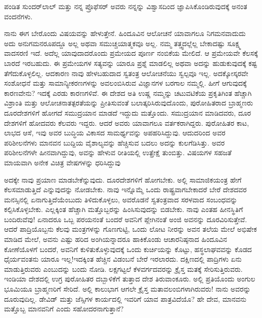 ಪಂಡಿತ ಸುಂದರ್‌ಲಾಲ್ ಮತ್ತು ನನ್ನ ಪ್ರೊಫೆಸರ್ ಅವರು ನನ್ನನ್ನು ವಿಶ್ವಾಸದಿಂದ ಜ್ಞಾಪಿಸಿಕೊಂಡಿರುವುದಕ್ಕೆ ಅನಂತ ವಂದನೆಗಳು.

ನಾನು ಈಗ ಬೇರೊಂದು ವಿಷಯವನ್ನು ಹೇಳುತ್ತೇನೆ. ಹಿಂದೂವಿನ ಆಲೋಚನೆ ಯಾವಾಗಲೂ ನಿಗಮನವಾದುದು  ಅದು ಅನುಗಮನರೂಪದ್ದೂ  ಅಲ್ಲ ಅಥವಾ ಸಮುಚ್ಚಯಾತ್ಮಕವೂ  ಅಲ್ಲ. ನಮ್ಮ ತತ್ತ್ವದಲ್ಲೆಲ್ಲ ಬೇಕಾದಷ್ಟು ಸೂಕ್ಷ್ಮ ವಾದಸರಣಿ ಇದೆ. ಅದೆಲ್ಲ ಯಾವುದಾದರೊಂದು ಪ್ರಮೇಯದ  ಪೂರ್ಣ ನಂಬಿಕೆಯ ಮೇಲಿದೆ. ಆ ಪ್ರಮೇಯವೇ ಕೆಲಸಕ್ಕೆ ಬಾರದೆ ಇರಬಹುದು. ಈ ಪ್ರಮೇಯಗಳ ಸತ್ಯವನ್ನು ಯಾರೂ ಪ್ರಶ್ನೆ ಮಾಡಲಿಲ್ಲ ಅಥವಾ ಅದನ್ನು ಹುಡುಕುವುದಕ್ಕೆ ಕಷ್ಟ ತೆಗೆದುಕೊಳ್ಳಲಿಲ್ಲ. ಆದಕಾರಣ ನಾವು ಹೇಳಬಹುದಾದ ಸ್ವತಂತ್ರ ಆಲೋಚನೆಯು ಸ್ವಲ್ಪವೂ ಇಲ್ಲ. ಅದಕ್ಕೋಸ್ಕರವೇ ಸಂಶೋಧನೆ ಮತ್ತು ಸಾಮಾನ್ಯೀಕರಣಗಳನ್ನು ಅವಲಂಬಿಸಿರುವ ವಿಜ್ಞಾನಗಳ ಬರಗಾಲ ನಮ್ಮಲ್ಲಿ. ಹೀಗೆ ಆಗುವುದಕ್ಕೆ ಕಾರಣವೇನು? ಇದಕ್ಕೆ ಎರಡು ಕಾರಣಗಳಿವೆ. ಈ ದೇಶದ ಅತಿ ಉಷ್ಣ ನಮ್ಮನ್ನು ಚಟುವಟಿಕೆಯ ಪ್ರಕೃತಿಗಿಂತ ಹೆಚ್ಚಾಗಿ ವಿಶ್ರಾಂತಿ ಮತ್ತು ಆಲೋಚನಾತತ್ಪರತೆಯನ್ನು ಪ್ರೀತಿಸುವಂತೆ ಬಲಾತ್ಕರಿಸಿರುವುದೊಂದು, ಪುರೋಹಿತರಾದ ಬ್ರಾಹ್ಮಣರು ದೂರದೇಶಗಳಿಗೆ ಹೋಗದೆ ಸಮುದ್ರಯಾನ ಮಾಡದೆ ಇದ್ದುದು ಮತ್ತೊಂದು. ಸಮುದ್ರಯಾನ ಮಾಡಿದವರು, ದೂರ ದೇಶಗಳಿಗೆ ಹೋದವರು ಕೆಲವರು ಇದ್ದರು. ಆದರೆ ಅವರು ಯಾವಾಗಲೂ ವರ್ತಕರಾಗಿದ್ದರು. ಪುರೋಹಿತರ ಕಾಟ, ಲಾಭದ ಆಸೆ, ಇವು ಅವರ ಬುದ್ಧಿಯ ವಿಕಾಸದ ಸಾಮರ್ಥ್ಯವನ್ನು ಅಪಹರಿಸಿದ್ದುವು. ಆದುದರಿಂದ ಅವರ ಪರಿಶೀಲನೆಗಳು ಮಾನವನ ಬುದ್ದಿಯ ವೈಶಾಲ್ಯವನ್ನು ಹೆಚ್ಚಿಸುವ ಬದಲು ಅದನ್ನು ಕುಲಗೆಡಿಸಿತ್ತು. ಅವರ ಪರಿಶೀಲನೆಗಳೇ ಹೀನವಾಗಿದ್ದುವು, ಅವನ್ನು ಹೇಳುವ ರೀತಿಯಲ್ಲಿ ಉತ್ಪ್ರೇಕ್ಷೆ ತುಂಬಿತ್ತು. ವಿಷಯಗಳ ಸಹಜತೆ ಮಾಯವಾಗಿ ಅನೇಕ ವಿಚಿತ್ರ ವೇಷಗಳನ್ನು ಧರಿಸಿದ್ದುವು

ಅದಕ್ಕೇ ನಾವು ಪ್ರಯಾಣ ಮಾಡಬೇಕೆನ್ನುವುದು. ದೂರದೇಶಗಳಿಗೆ ಹೋಗಬೇಕು. ಅಲ್ಲಿ ಸಾಮಾಜಿಕಯಂತ್ರ ಹೇಗೆ ಕೆಲಸಮಾಡುತ್ತಿದೆ ಎನ್ನುವುದನ್ನು ನೋಡಬೇಕು. ನಾವು ಇನ್ನೊಮ್ಮೆ ಒಂದು ರಾಷ್ಟ್ರವಾಗಬೇಕಾದರೆ ಬೇರೆ ದೇಶದವರ ಮನಸ್ಸಿನಲ್ಲಿ ಏನಾಗುತ್ತಿದೆಯೆಂಬುದು ತಿಳಿದುಕೊಳ್ಳಲು, ಅವರೊಡನೆ ಸ್ವತಂತ್ರವಾದ ಸರಳವಾದ ಸಂಬಂಧವನ್ನು ಕಲ್ಪಿಸಿಕೊಳ್ಳಬೇಕು. ಎಲ್ಲಕ್ಕಿಂತ ಹೆಚ್ಚಾಗಿ ಮತ್ತೊಬ್ಬರನ್ನು ಹಿಂಸಿಸುವುದನ್ನು ಬಿಡಬೇಕು. ನಾವು ಎಂತಹ ಹೀನಸ್ಥಿತಿಗೆ ಬಂದಿರುವೆವು! ಏನಾದರೂ ಒಬ್ಬ ಪರಯನಂತೆ ಬಂದರೆ ಅವನಿಗೆ ಪ್ಲೇಗಿನಂತೆ ಅಂಜಿ ಅವನನ್ನು ದೂರವಿರಿಸುತ್ತೇವೆ. ಆದರೆ ಪಾದ್ರಿಯೊಬ್ಬನು ಕೆಲವು ಮಂತ್ರಗಳನ್ನು ಗೊಣಗುಟ್ಟಿ, ಒಂದು ಲೋಟ ನೀರನ್ನು ಅವನ ತಲೆಯ ಮೇಲೆ ಅಭಿಷೇಕ ಮಾಡಿದ ಮೇಲೆ, ಅವನು ಎಷ್ಟು ಹರಿದ ಅಂಗಿಯನ್ನಾದರೂ ಹಾಕಿಕೊಂಡು ಆಚಾರನಿಷ್ಠನಾದ ಹಿಂದೂವಿನ ಕೋಣೆಯೊಳಗೆ ಬಂದರೆ, ಅವನಿಗೆ ಕುಳಿತುಕೊಳ್ಳುವುದಕ್ಕೆ ಒಂದು ಕುರ್ಚಿಯನ್ನು ಕೊಟ್ಟು, ಹಸ್ಥಲಾಘವವನ್ನು ಕೊಡದ ಧೈರ್ಯವಂತನು ಯಾರೂ ಇಲ್ಲ!ಇದಕ್ಕಿಂತ ಹೆಚ್ಚಿನ ವಿಡಂಬನೆ ಬೇರೆ ಇರಲಾರದು. ದಕ್ಷಿಣದಲ್ಲಿ ಪಾದ್ರಿಗಳು ಏನು ಮಾಡುತ್ತಿರುವರು ಎಂಬುದನ್ನು ಬಂದು ನೋಡಿ. ಲಕ್ಷಗಟ್ಟಲೆ ಕೆಳವರ್ಗದವರನ್ನು ಕ್ರೈಸ್ತ ಮತಕ್ಕೆ ಸೇರಿಸುತ್ತಿರುವರು. ಇಂಡಿಯಾ ದೇಶದಲ್ಲಿ ಉಗ್ರ ಪುರೋಹಿತರ ದಬ್ಬಾಳಿಕೆಗೆ ತುತ್ತಾದ ದೇಶ ತಿರುವಾಂಕೂರು. ಅಲ್ಲಿ ಪ್ರತಿಯೊಂದು ಅಂಗುಲ ಭೂಮಿಯೂ ಬ್ರಾಹ್ಮಣರಿಗೆ ಸೇರಿದೆ. ಅಲ್ಲಿ ಕಾಲುಭಾಗ ಆಗಲೇ ಕ್ರೈಸ್ತ ಮತಾವಲಂಬಿಗಳಾಗಿರುವರು! ನಾನು ಅವರನ್ನು ದೂರುವುದಿಲ್ಲ. ಡೇವಿಡ್ ಮತ್ತು ಜೆಸ್ಸಿಗಳ ಕಾರ್ಯದಲ್ಲಿ ಇವರಿಗೆ ಯಾವ ಪಾತ್ರವಿದೆಯೊ? ಹೇ ದೇವ, ಮಾನವನು ಮತ್ತೊಬ್ಬ ಮಾನವನಿಗೆ ಎಂದು ಸಹೋದರನಾಗುತ್ತಾನೆ?

